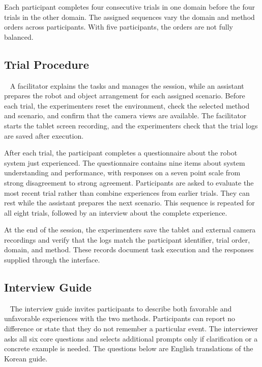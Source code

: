 Each participant completes four consecutive trials in one domain before the four trials in the other domain. The assigned sequences vary the domain and method orders across participants. With five participants, the orders are not fully balanced.

\subsection{Trial Procedure}~\label{appx:user_procedure}
A facilitator explains the tasks and manages the session, while an assistant prepares the robot and object arrangement for each assigned scenario. Before each trial, the experimenters reset the environment, check the selected method and scenario, and confirm that the camera views are available. The facilitator starts the tablet screen recording, and the experimenters check that the trial logs are saved after execution.

After each trial, the participant completes a questionnaire about the robot system just experienced. The questionnaire contains nine items about system understanding and performance, with responses on a seven point scale from strong disagreement to strong agreement. Participants are asked to evaluate the most recent trial rather than combine experiences from earlier trials. They can rest while the assistant prepares the next scenario. This sequence is repeated for all eight trials, followed by an interview about the complete experience.

At the end of the session, the experimenters save the tablet and external camera recordings and verify that the logs match the participant identifier, trial order, domain, and method. These records document task execution and the responses supplied through the interface.

\subsection{Interview Guide}~\label{appx:user_interview}
The interview guide invites participants to describe both favorable and unfavorable experiences with the two methods. Participants can report no difference or state that they do not remember a particular event. The interviewer asks all six core questions and selects additional prompts only if clarification or a concrete example is needed. The questions below are English translations of the Korean guide.

